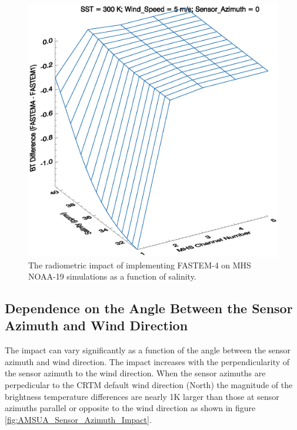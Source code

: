 \begin{figure}[htp]
  \centering
  \includegraphics[scale=0.75]{graphics/MHS_Salinity_BT.eps}
  \caption{The radiometric impact of implementing FASTEM-4 on MHS NOAA-19 simulations as a function of salinity.}
  \label{fig:MHS_Salinity_Impact}
\end{figure}

\newpage

\subsection{Dependence on the Angle Between the Sensor Azimuth and Wind Direction} 
The impact can vary significantly as a function of the angle between the sensor azimuth and wind direction.  The impact increases with the perpendicularity of the sensor azimuth to the wind direction.  When the sensor azimuths are perpedicular to the CRTM default wind direction (North) the magnitude of the brightness temperature differences are nearly 1K larger than those at sensor azimuths parallel or opposite to the wind direction as shown in figure \ref{fig:AMSUA_Sensor_Azimuth_Impact}.  

